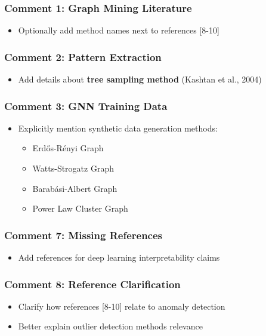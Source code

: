 \subsubsection*{Comment 1: Graph Mining Literature}
\begin{itemize}
    \item[$\square$] Optionally add method names next to references [8-10]
\end{itemize}

\subsubsection*{Comment 2: Pattern Extraction}
\begin{itemize}
    \item[$\square$] Add details about \textbf{tree sampling method} (Kashtan et al., 2004)
\end{itemize}

\subsubsection*{Comment 3: GNN Training Data}
\begin{itemize}
    \item[$\square$] Explicitly mention synthetic data generation methods:
    \begin{itemize}
        \item Erdős-Rényi Graph
        \item Watts-Strogatz Graph
        \item Barabási-Albert Graph
        \item Power Law Cluster Graph
    \end{itemize}
\end{itemize}

\subsubsection*{Comment 7: Missing References}
\begin{itemize}
    \item[$\square$] Add references for deep learning interpretability claims
\end{itemize}

\subsubsection*{Comment 8: Reference Clarification}
\begin{itemize}
    \item[$\square$] Clarify how references [8-10] relate to anomaly detection
    \item[$\square$] Better explain outlier detection methods relevance
\end{itemize}

